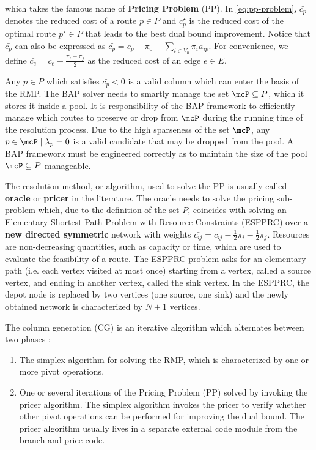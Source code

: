 which takes the famous name of \textbf{Pricing Problem} (PP).
In \cref{eq:pp-problem}, $\bar{c_p}$ denotes the reduced cost of a route $p \in P$
and $c^\star_p$ is the reduced cost of the optimal route $p^\star \in P$
that leads to the best dual bound improvement.
Notice that $\bar{c_p}$ can also be expressed as $\bar{c_p} = c_p - \pi_0 - \sum_{i \in V_0} \pi_i a_{ip}$.
For convenience,
we define $\bar{c_{e}} = c_{e} - \frac{\pi_i + \pi_j}{2}$
as the reduced cost of an edge $e\in E$.

Any $p \in P$ which satisfies $\bar{c_p} < 0$ is a valid column which can enter the basis of the RMP.
The BAP solver needs to smartly manage the set $\mcP \subseteq P$, which it stores it inside a pool.
It is responsibility of the BAP framework to efficiently manage which routes
to preserve or drop from $\mcP$ during the running time of the resolution process.
Due to the high sparseness of the set $\mcP$, any $p \in \mcP \mid \lambda_p = 0$
is a valid candidate that may be dropped from the pool.
A BAP framework must be engineered correctly as to maintain
the size of the pool $\mcP \subseteq P$ manageable.

\medskip

The resolution method, or algorithm,
used to solve the PP is usually called \textbf{oracle} or \textbf{pricer} in the literature.
The oracle needs to solve the pricing sub-problem which, due to the definition of the set $P$,
coincides with solving an Elementary Shortest Path Problem with Resource Constraints (ESPPRC)
over a \textbf{new directed symmetric} network with weights
$\bar{c_{ij}} = c_{ij} - \frac{1}{2} \pi_i - \frac{1}{2} \pi_j$.
Resources are non-decreasing quantities,
such as capacity or time,
which are used to evaluate
the feasibility of a route.
The ESPPRC problem asks for an elementary path (i.e. each vertex visited at most once) starting
from a vertex, called a source vertex, and ending in another vertex, called the sink vertex.
In the ESPPRC, the depot node is replaced by two vertices (one source, one sink)
and the newly obtained network is characterized by $N + 1$ vertices.

\medskip

The column generation (CG) is an iterative algorithm which alternates between two phases \parencite{desaulniers2018}:
\begin{enumerate}
	\setlength{\itemsep}{0pt}
	\setlength{\parskip}{0pt}

	\item The simplex algorithm for solving the RMP, which is characterized by one or more pivot operations.
	\item One or several iterations of the Pricing Problem (PP) solved by invoking the pricer algorithm.
	      The simplex algorithm invokes the pricer to verify whether other pivot operations
	      can be performed for improving the dual bound.
	      The pricer algorithm usually lives in a separate external code module from the branch-and-price code.
\end{enumerate}

